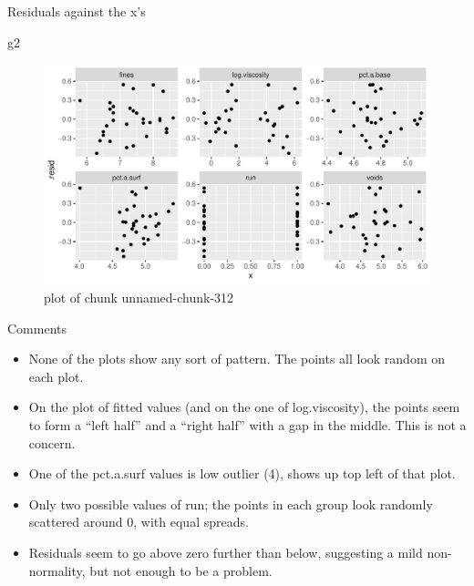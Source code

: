 \documentclass[ignorenonframetext,]{beamer}
\newenvironment{Shaded}{\begin{snugshade}}{\end{snugshade}}
\newcommand{\NormalTok}[1]{#1}
\providecommand{\tightlist}{%
  \setlength{\itemsep}{0pt}\setlength{\parskip}{0pt}}
\begin{document}
\begin{frame}[fragile]{Residuals against the x's}
\protect\hypertarget{residuals-against-the-xs}{}

\begin{Shaded}
\begin{Highlighting}[]
\NormalTok{g2}
\end{Highlighting}
\end{Shaded}

\begin{figure}
\centering
\includegraphics{figure/unnamed-chunk-312-1.pdf}
\caption{plot of chunk unnamed-chunk-312}
\end{figure}

\end{frame}

\begin{frame}{Comments}
\protect\hypertarget{comments-24}{}

\begin{itemize}
\tightlist
\item
  None of the plots show any sort of pattern. The points all look random
  on each plot.
\item
  On the plot of fitted values (and on the one of log.viscosity), the
  points seem to form a ``left half'' and a ``right half'' with a gap in
  the middle. This is not a concern.
\item
  One of the pct.a.surf values is low outlier (4), shows up top left of
  that plot.
\item
  Only two possible values of run; the points in each group look
  randomly scattered around 0, with equal spreads.
\item
  Residuals seem to go above zero further than below, suggesting a mild
  non-normality, but not enough to be a problem.
\end{itemize}

\end{frame}
\end{document}
